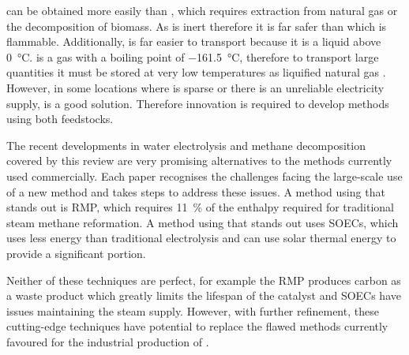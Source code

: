  can be obtained more easily than  , which requires extraction from natural gas or the decomposition of biomass.
As  is inert therefore it is far safer than   which is flammable.
Additionally,   is far easier to transport because it is a liquid above \SI{0}{\celsius}.
 is a gas with a boiling point of \SI{-161.5}{\celsius}\cite{Lemmon2017}, therefore to transport large quantities it must be stored at very low temperatures as liquified natural gas \cite{lngamerica}.
However, in some locations where   is sparse or there is an unreliable electricity supply,  is a good solution\cite{SBN2020}.
Therefore innovation is required to develop methods using both feedstocks.

The recent developments in water electrolysis and methane decomposition covered by this review are very promising alternatives to the methods currently used commercially.
Each paper recognises the challenges facing the large-scale use of a new method and takes steps to address these issues.
A method using   that stands out is RMP, which requires \SI{11}{\percent} of the enthalpy required for traditional steam methane reformation.
A method using   that stands out uses SOECs, which uses less energy than traditional electrolysis and can use solar thermal energy to provide a significant portion.

Neither of these techniques are perfect, for example the RMP produces carbon as a waste product which greatly limits the lifespan of the catalyst and SOECs have issues maintaining the steam supply.
However, with further refinement, these cutting-edge techniques have potential to replace the flawed methods currently favoured for the industrial production of  .

